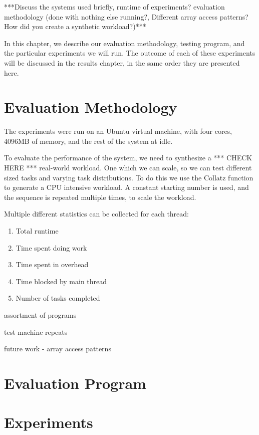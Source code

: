 
***Discuss the systems used briefly, runtime of experiments? evaluation methodology (done with nothing else running?, Different array access patterns? How did you create a synthetic workload?)***

In this chapter, we describe our evaluation methodology, testing program, and the particular experiments we will run. The outcome of each of these experiments will be discussed in the results chapter, in the same order they are presented here.



\section{Evaluation Methodology}

The experiments were run on an Ubuntu virtual machine, with four cores, 4096MB of memory, and the rest of the system at idle.

To evaluate the performance of the system, we need to synthesize a *** CHECK HERE *** real-world workload. One which we can scale, so we can test different sized tasks and varying task distributions. To do this we use the Collatz function to generate a CPU intensive workload. A constant starting number is used, and the sequence is repeated multiple times, to scale the workload.

Multiple different statistics can be collected for each thread:

\begin{enumerate}
	\item Total runtime
	\item Time spent doing work
	\item Time spent in overhead
	\item Time blocked by main thread
	\item Number of tasks completed
\end{enumerate}

assortment of programs

test machine
repeats

future work - array access patterns



\section{Evaluation Program}



\section{Experiments}



